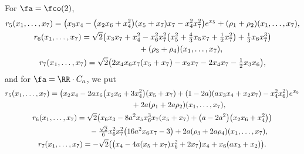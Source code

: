 For $\fa=\fco(2)$,
\begin{gather*}
r_5(x_1,\dots, x_7) = \big(x_3x_4-\big(x_2x_6+x_4^2\big)(x_5+x_7)x_7-x_4^2x_7^2\big)e^{x_5} +(\rho_1+\rho_2)(x_1,\dots,x_7),\\
r_6(x_1,\dots, x_7) = \sqrt2\big(x_3x_7+x_4^2-x_6^2x_7^2\big(x_5^2+\tfrac43 x_5x_7+\tfrac12x_7^2\big)+\tfrac13x_6x_7^3\big) \\
\hphantom{r_6(x_1,\dots, x_7) =}{} +(\rho_3+\rho_4)(x_1,\dots,x_7) ,\\
r_7(x_1,\dots, x_7) = \sqrt2\big(2x_4x_6x_7(x_5+x_7)-x_2x_7-2x_4x_7-\tfrac12 x_3x_6\big),
\end{gather*}
and for $\fa=\RR\cdot C_a$, we put
\begin{gather*}
r_5(x_1,\dots, x_7) = \big(x_2x_4-2ax_6\big(x_2x_6+3x_4^2\big)(x_5+x_7)+(1 - 2a)(ax_3x_4+x_2x_7)-x_4^2x_6^2\big)e^{x_5} \\
 \hphantom{r_5(x_1,\dots, x_7) =}{} +2a(\rho_1+2a\rho_2)(x_1,\dots, x_7),\\
r_6(x_1,\dots, x_7) = \sqrt2\big(x_6x_3-8a^2x_5x_6^3x_7(x_5+x_7)+\big(a-2a^2\big)\big(x_2x_6+x_4^2\big)\big) \\
 \hphantom{r_6(x_1,\dots, x_7) =}{} -\tfrac{\sqrt2}6x_6^2x_7^2\big(16a^2x_6x_7-3\big) +2a(\rho_3+2a\rho_4)(x_1,\dots, x_7),\\
r_7(x_1,\dots, x_7) = -\sqrt 2\big(\big(x_4-4a(x_5+x_7)x_6^2+2x_7\big)x_4+x_6(ax_3+x_2)\big).
\end{gather*}
